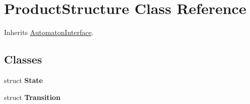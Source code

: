 \hypertarget{class_product_structure}{\section{Product\-Structure Class Reference}
\label{class_product_structure}
}


Inherits \hyperlink{class_automaton_interface}{Automaton\-Interface}.

\subsection*{Classes}
\begin{DoxyCompactItemize}
\item 
struct {\bfseries State}
\item 
struct {\bfseries Transition}
\end{DoxyCompactItemize}
